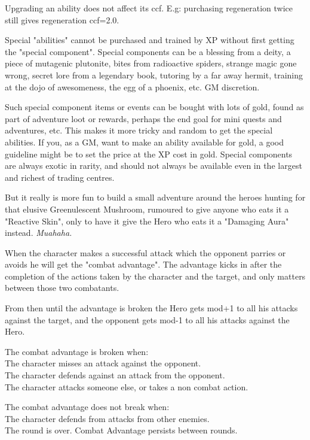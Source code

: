 Upgrading an ability does not affect its ccf. E.g: purchasing regeneration twice still gives regeneration ccf=2.0.

Special "abilities" cannot be purchased and trained by XP without first getting the "special component". Special components can be a blessing from a deity, a piece of mutagenic plutonite, bites from radioactive spiders, strange magic gone wrong, secret lore from a legendary book, tutoring by a far away hermit, training at the dojo of awesomeness, the egg of a phoenix, etc. GM discretion.

Such special component items or events can be bought with lots of gold, found as part of adventure loot or rewards, perhaps the end goal for mini quests and adventures, etc. This makes it more tricky and random to get the special abilities. If you, as a GM, want to make an ability available for gold, a good guideline might be to set the price at the XP cost in gold. Special components are always exotic in rarity, and should not always be available even in the largest and richest of trading centres.

But it really is more fun to build a small adventure around the heroes hunting for that elusive Greenulescent Mushroom, rumoured to give anyone who eats it a "Reactive Skin", only to have it give the Hero who eats it a "Damaging Aura" instead. \emph{Muahaha.}


\openskillslist

 When the character makes a successful attack which the opponent parries or avoids he will get the "combat advantage". The advantage kicks in after the completion of the actions taken by the character and the target, and only matters between those two combatants.

From then until the advantage is broken the Hero gets mod+1 to all his attacks against the target, and the opponent gets mod-1 to all his attacks against the Hero.

The combat advantage is broken when: \\
The character misses an attack against the opponent. \\
The character defends against an attack from the opponent. \\
The character attacks someone else, or takes a non combat action.

The combat advantage does not break when: \\
The character defends from attacks from other enemies. \\
The round is over. Combat Advantage persists between rounds.

